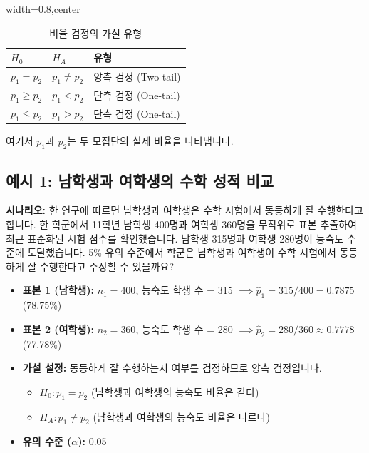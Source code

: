 \documentclass[11pt,a4paper]{article}
\begin{document}
\begin{table}[h!]
\caption{비율 검정의 가설 유형}
\label{tab:proportion_hypotheses}
\centering
\begin{adjustbox}{width=0.8\textwidth,center}
\begin{tabular}{lll}
\toprule
\textbf{$H_0$} & \textbf{$H_A$} & \textbf{유형} \\
\midrule
$p_1 = p_2$ & $p_1 \ne p_2$ & 양측 검정 (Two-tail) \\
$p_1 \ge p_2$ & $p_1 < p_2$ & 단측 검정 (One-tail) \\
$p_1 \le p_2$ & $p_1 > p_2$ & 단측 검정 (One-tail) \\
\bottomrule
\end{tabular}
\end{adjustbox}
\end{table}
여기서 $p_1$과 $p_2$는 두 모집단의 실제 비율을 나타냅니다.

\subsection*{예시 1: 남학생과 여학생의 수학 성적 비교}
\begin{examplebox}
\textbf{시나리오:}
한 연구에 따르면 남학생과 여학생은 수학 시험에서 동등하게 잘 수행한다고 합니다. 한 학군에서 11학년 남학생 400명과 여학생 360명을 무작위로 표본 추출하여 최근 표준화된 시험 점수를 확인했습니다. 남학생 315명과 여학생 280명이 능숙도 수준에 도달했습니다. 5\% 유의 수준에서 학군은 남학생과 여학생이 수학 시험에서 동등하게 잘 수행한다고 주장할 수 있을까요?
\end{examplebox}

\begin{itemize}
    \item \textbf{표본 1 (남학생):} $n_1 = 400$, 능숙도 학생 수 = 315 $\implies \hat{p}_1 = 315/400 = 0.7875$ (78.75\%)
    \item \textbf{표본 2 (여학생):} $n_2 = 360$, 능숙도 학생 수 = 280 $\implies \hat{p}_2 = 280/360 \approx 0.7778$ (77.78\%)
    \item \textbf{가설 설정:} 동등하게 잘 수행하는지 여부를 검정하므로 양측 검정입니다.
    \begin{itemize}
        \item $H_0: p_1 = p_2$ (남학생과 여학생의 능숙도 비율은 같다)
        \item $H_A: p_1 \ne p_2$ (남학생과 여학생의 능숙도 비율은 다르다)
    \end{itemize}
    \item \textbf{유의 수준 ($\alpha$):} 0.05
\end{itemize}
\end{document}
